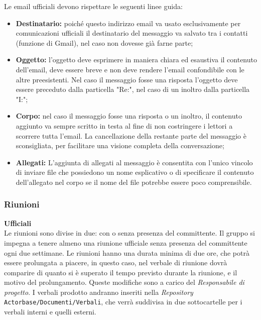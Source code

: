 \documentclass[a4paper]{article}
\begin{document}
	Le email ufficiali devono rispettare le seguenti linee guida:
	\begin{itemize}
		\item \textbf{Destinatario:} poiché questo indirizzo email va usato esclusivamente per comunicazioni ufficiali il destinatario
		del messaggio va salvato tra i contatti (funzione di Gmail), nel caso non dovesse già farne parte;
		\item \textbf{Oggetto:} l'oggetto deve esprimere in maniera chiara ed esaustiva il contenuto dell'email, deve essere breve
		 e non deve rendere l'email confondibile con le altre preesistenti.
		 Nel caso il messaggio fosse una risposta l'oggetto deve essere preceduto dalla particella "Re:", nel caso di un inoltro dalla
		 particella "I:";
		\item \textbf{Corpo:} nel caso il messaggio fosse una risposta o un inoltro, il contenuto aggiunto va sempre scritto in testa al
		fine di non costringere i lettori a scorrere tutta l'email. La cancellazione della restante parte del messaggio è sconsigliata, per
		facilitare una visione completa della conversazione;
		\item \textbf{Allegati:} L'aggiunta di allegati al messaggio è consentita con l'unico vincolo di inviare file che possiedono un nome
		esplicativo o di specificare il contenuto dell'allegato nel corpo se il nome del file potrebbe essere poco comprensibile.
	\end{itemize}
	\subsubsection{Riunioni}
		\textbf{Ufficiali} \\
		Le riunioni sono divise in due: con o senza presenza del committente. Il gruppo si impegna a tenere almeno una riunione
		ufficiale senza presenza del committente ogni due settimane. Le riunioni hanno una durata minima di due ore, che potrà
		essere prolungata a piacere, in questo caso, nel verbale di riunione dovrà comparire di quanto si è superato il tempo
		previsto durante la riunione, e il motivo del prolungamento. Queste modifiche sono a carico del \emph{Responsabile di progetto}.
		I verbali prodotto andranno inseriti nella \emph{Repository} \verb|Actorbase/Documenti/Verbali|, che verrà suddivisa in due
		sottocartelle per i verbali interni e quelli esterni.
\end{document}
